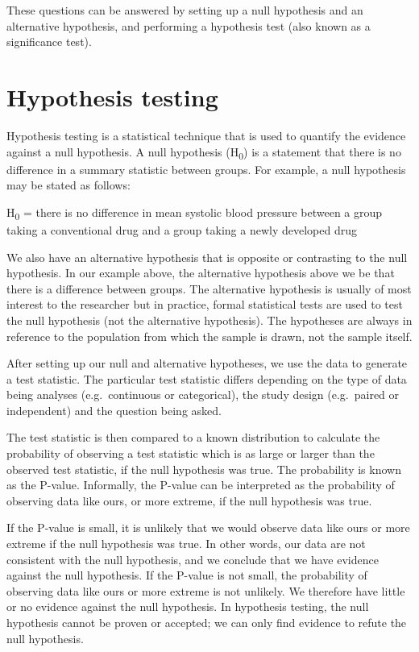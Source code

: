 \documentclass[
]{memoir}
\begin{document}
These questions can be answered by setting up a null hypothesis and an alternative hypothesis, and performing a hypothesis test (also known as a significance test).

\hypertarget{hypothesis-testing-1}{%
\section{Hypothesis testing}\label{hypothesis-testing-1}}

Hypothesis testing is a statistical technique that is used to quantify the evidence against a null hypothesis. A null hypothesis (H\textsubscript{0}) is a statement that there is no difference in a summary statistic between groups. For example, a null hypothesis may be stated as follows:

H\textsubscript{0} = there is no difference in mean systolic blood pressure between a group taking a conventional drug and a group taking a newly developed drug

We also have an alternative hypothesis that is opposite or contrasting to the null hypothesis. In our example above, the alternative hypothesis above we be that there is a difference between groups. The alternative hypothesis is usually of most interest to the researcher but in practice, formal statistical tests are used to test the null hypothesis (not the alternative hypothesis). The hypotheses are always in reference to the population from which the sample is drawn, not the sample itself.

After setting up our null and alternative hypotheses, we use the data to generate a test statistic. The particular test statistic differs depending on the type of data being analyses (e.g.~continuous or categorical), the study design (e.g.~paired or independent) and the question being asked.

The test statistic is then compared to a known distribution to calculate the probability of observing a test statistic which is as large or larger than the observed test statistic, if the null hypothesis was true. The probability is known as the P-value.
Informally, the P-value can be interpreted as the probability of observing data like ours, or more extreme, if the null hypothesis was true.

If the P-value is small, it is unlikely that we would observe data like ours or more extreme if the null hypothesis was true. In other words, our data are not consistent with the null hypothesis, and we conclude that we have evidence against the null hypothesis. If the P-value is not small, the probability of observing data like ours or more extreme is not unlikely. We therefore have little or no evidence against the null hypothesis. In hypothesis testing, the null hypothesis cannot be proven or accepted; we can only find evidence to refute the null hypothesis.
\end{document}
